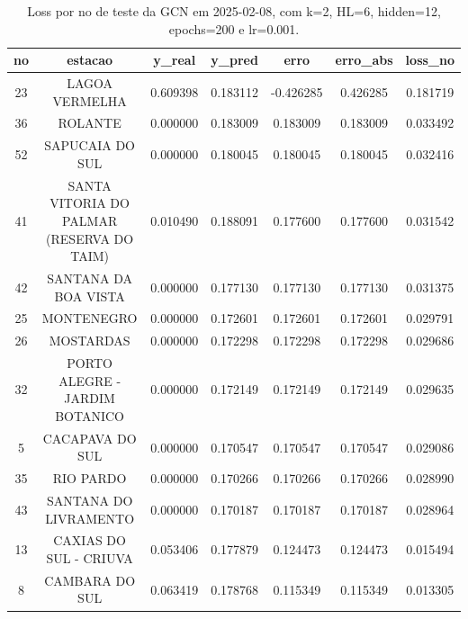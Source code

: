\begin{table}[h]
\centering
\caption{Loss por no de teste da GCN em 2025-02-08, com k=2, HL=6, hidden=12, epochs=200 e lr=0.001.}
\label{tab:gcn_loss_k2_hl6_h12_e200_d20250208}
\begin{tabular}{ccccccc}
\toprule
no & estacao & y\_real & y\_pred & erro & erro\_abs & loss\_no \\
\midrule
23 & LAGOA VERMELHA & 0.609398 & 0.183112 & -0.426285 & 0.426285 & 0.181719 \\
36 & ROLANTE & 0.000000 & 0.183009 & 0.183009 & 0.183009 & 0.033492 \\
52 & SAPUCAIA DO SUL & 0.000000 & 0.180045 & 0.180045 & 0.180045 & 0.032416 \\
41 & SANTA VITORIA DO PALMAR (RESERVA DO TAIM) & 0.010490 & 0.188091 & 0.177600 & 0.177600 & 0.031542 \\
42 & SANTANA DA BOA VISTA & 0.000000 & 0.177130 & 0.177130 & 0.177130 & 0.031375 \\
25 & MONTENEGRO & 0.000000 & 0.172601 & 0.172601 & 0.172601 & 0.029791 \\
26 & MOSTARDAS & 0.000000 & 0.172298 & 0.172298 & 0.172298 & 0.029686 \\
32 & PORTO ALEGRE - JARDIM BOTANICO & 0.000000 & 0.172149 & 0.172149 & 0.172149 & 0.029635 \\
5 & CACAPAVA DO SUL & 0.000000 & 0.170547 & 0.170547 & 0.170547 & 0.029086 \\
35 & RIO PARDO & 0.000000 & 0.170266 & 0.170266 & 0.170266 & 0.028990 \\
43 & SANTANA DO LIVRAMENTO & 0.000000 & 0.170187 & 0.170187 & 0.170187 & 0.028964 \\
13 & CAXIAS DO SUL - CRIUVA & 0.053406 & 0.177879 & 0.124473 & 0.124473 & 0.015494 \\
8 & CAMBARA DO SUL & 0.063419 & 0.178768 & 0.115349 & 0.115349 & 0.013305 \\
\bottomrule
\end{tabular}
\end{table}
